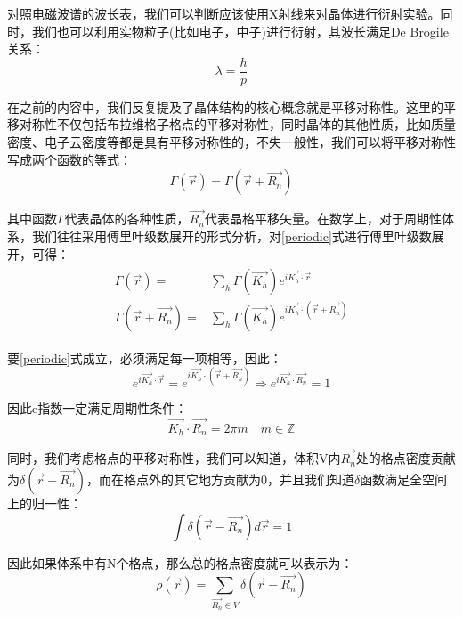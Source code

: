 \documentclass{ctexart}
\begin{document}
    对照电磁波谱的波长表，我们可以判断应该使用X射线来对晶体进行衍射实验。同时，我们也可以利用实物粒子(比如电子，中子)进行衍射，其波长满足De Brogile关系：
    \begin{equation}
        \lambda=\frac{h}{p}
    \end{equation}
    
    在之前的内容中，我们反复提及了晶体结构的核心概念就是平移对称性。这里的平移对称性不仅包括布拉维格子格点的平移对称性，同时晶体的其他性质，比如质量密度、电子云密度等都是具有平移对称性的，不失一般性，我们可以将平移对称性写成两个函数的等式：
    \begin{equation}\label{periodic}
        \Gamma(\Vec{r})=\Gamma(\Vec{r}+\Vec{R_n})
    \end{equation}
    
    其中函数$\Gamma$代表晶体的各种性质，$\Vec{R_n}$代表晶格平移矢量。在数学上，对于周期性体系，我们往往采用傅里叶级数展开的形式分析，对\eqref{periodic}式进行傅里叶级数展开，可得：
    \begin{align}
        \begin{split}
            \Gamma(\Vec{r})=&\sum_h \Gamma(\Vec{K_h})e^{i\Vec{K_h}\cdot \Vec{r}}\\
            \Gamma(\Vec{r}+\Vec{R_n})=&\sum_h \Gamma(\Vec{K_h})e^{i\Vec{K_h}\cdot (\Vec{r}+\Vec{R_n})}
        \end{split}
    \end{align}
    
    要\eqref{periodic}式成立，必须满足每一项相等，因此：
    \begin{equation}
        e^{i\Vec{K_h}\cdot \Vec{r}}=e^{i\Vec{K_h}\cdot (\Vec{r}+\Vec{R_n})}\Rightarrow e^{i\Vec{K_h}\cdot\Vec{R_n}}=1
    \end{equation}
    
    因此e指数一定满足周期性条件：
    \begin{equation}\label{periodicB}
        \Vec{K_h}\cdot \Vec{R_n} =2\pi m \quad m\in \mathbb{Z}
    \end{equation}
    
    同时，我们考虑格点的平移对称性，我们可以知道，体积V内$\Vec{R_n}$处的格点密度贡献为$\delta(\Vec{r}-\Vec{R_n})$，而在格点外的其它地方贡献为0，并且我们知道$\delta$函数满足全空间上的归一性：
    \begin{equation}
        \int \delta(\Vec{r}-\Vec{R_n}) d\Vec{r}=1
    \end{equation}
    
    因此如果体系中有N个格点，那么总的格点密度就可以表示为：
    \begin{equation}
        \rho(\Vec{r})=\sum_{\Vec{R_n}\in V}\delta(\Vec{r}-\Vec{R_n})
    \end{equation}
\end{document}
